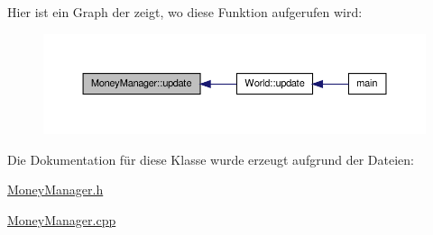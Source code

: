 Hier ist ein Graph der zeigt, wo diese Funktion aufgerufen wird\-:
\nopagebreak
\begin{figure}[H]
\begin{center}
\leavevmode
\includegraphics[width=350pt]{class_money_manager_a2732c50d4ab200fa9aa89881ddaafe9b_icgraph}
\end{center}
\end{figure}




Die Dokumentation für diese Klasse wurde erzeugt aufgrund der Dateien\-:\begin{DoxyCompactItemize}
\item 
\hyperlink{_money_manager_8h}{Money\-Manager.\-h}\item 
\hyperlink{_money_manager_8cpp}{Money\-Manager.\-cpp}\end{DoxyCompactItemize}
